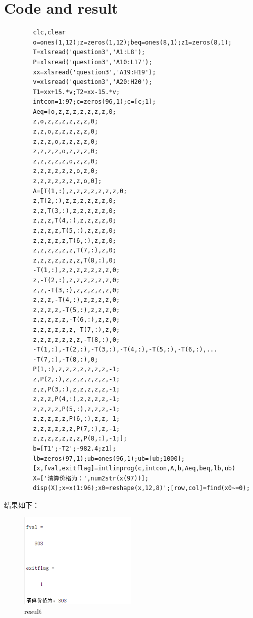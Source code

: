 \documentclass[12pt]{article} %
\begin{document}
	
	\section{Code and result}
	\begin{lstlisting}
		clc,clear
		o=ones(1,12);z=zeros(1,12);beq=ones(8,1);z1=zeros(8,1);
		T=xlsread('question3','A1:L8');
		P=xlsread('question3','A10:L17');
		xx=xlsread('question3','A19:H19');
		v=xlsread('question3','A20:H20');
		T1=xx+15.*v;T2=xx-15.*v;
		intcon=1:97;c=zeros(96,1);c=[c;1];
		Aeq=[o,z,z,z,z,z,z,z,0;
		z,o,z,z,z,z,z,z,0;
		z,z,o,z,z,z,z,z,0;
		z,z,z,o,z,z,z,z,0;
		z,z,z,z,o,z,z,z,0;
		z,z,z,z,z,o,z,z,0;
		z,z,z,z,z,z,o,z,0;
		z,z,z,z,z,z,z,o,0];
		A=[T(1,:),z,z,z,z,z,z,z,0;
		z,T(2,:),z,z,z,z,z,z,0;
		z,z,T(3,:),z,z,z,z,z,0;
		z,z,z,T(4,:),z,z,z,z,0;
		z,z,z,z,T(5,:),z,z,z,0;
		z,z,z,z,z,T(6,:),z,z,0;
		z,z,z,z,z,z,T(7,:),z,0;
		z,z,z,z,z,z,z,T(8,:),0;
		-T(1,:),z,z,z,z,z,z,z,0;
		z,-T(2,:),z,z,z,z,z,z,0;
		z,z,-T(3,:),z,z,z,z,z,0;
		z,z,z,-T(4,:),z,z,z,z,0;
		z,z,z,z,-T(5,:),z,z,z,0;
		z,z,z,z,z,-T(6,:),z,z,0;
		z,z,z,z,z,z,-T(7,:),z,0;
		z,z,z,z,z,z,z,-T(8,:),0;
		-T(1,:),-T(2,:),-T(3,:),-T(4,:),-T(5,:),-T(6,:),...
		-T(7,:),-T(8,:),0;
		P(1,:),z,z,z,z,z,z,z,-1;
		z,P(2,:),z,z,z,z,z,z,-1;
		z,z,P(3,:),z,z,z,z,z,-1;
		z,z,z,P(4,:),z,z,z,z,-1;
		z,z,z,z,P(5,:),z,z,z,-1;
		z,z,z,z,z,P(6,:),z,z,-1;
		z,z,z,z,z,z,P(7,:),z,-1;
		z,z,z,z,z,z,z,P(8,:),-1;];
		b=[T1';-T2';-982.4;z1];
		lb=zeros(97,1);ub=ones(96,1);ub=[ub;1000];
		[x,fval,exitflag]=intlinprog(c,intcon,A,b,Aeq,beq,lb,ub)
		X=['清算价格为：',num2str(x(97))];
		disp(X);x=x(1:96);x0=reshape(x,12,8)';[row,col]=find(x0~=0);
	\end{lstlisting}
	\indent 结果如下：
	\begin{figure}[ht]
		\centering
		\includegraphics[width=0.5\textwidth]{result.png}
		\caption{result}
		\label{fig:fig1}
	\end{figure}
	
\end{document}
